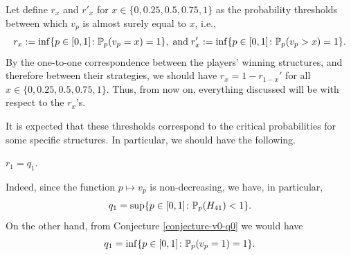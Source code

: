         Let define $r_{x}$ and $r'_{x}$ for $x \in \{0, 0.25, 0.5, 0.75, 1\}$ as the probability thresholds between which $v_p$ is almost surely equal to $x$, i.e.,
        \begin{equation*}
            r_x := \inf\{p \in [0, 1] \colon \mathbb{P}_p(v_p =  x) = 1\}, \; \text{and} \; r_x' := \inf\{p \in [0, 1] \colon \mathbb{P}_p(v_p > x) = 1\}.
        \end{equation*}
       By the one-to-one correspondence between the players' winning structures, and therefore between their strategies, we should have $r_x = 1 - r_{1-x}'$ for all $x \in \{0, 0.25, 0.5, 0.75, 1\}$. Thus, from now on, everything discussed will be with respect to the $r_x$'s.
        
        It is expected that these thresholds correspond to the critical probabilities for some specific structures. In particular, we should have the following.

        \begin{conjecture}\label{conjecture_q1_r1}
            $r_1 = q_1$.
        \end{conjecture}

        Indeed, since the function $p \mapsto v_p$ is non-decreasing, we have, in particular,
        $$
            q_1 = \sup \{p \in [0, 1] \colon \mathbb{P}_p(H_{41}) < 1\}.
        $$ 
        On the other hand, from Conjecture \ref{conjecture-v0-q0} we would have
        $$
            q_1 = \inf \{p \in [0, 1] \colon \mathbb{P}_p(v_p = 1) = 1\}.
        $$
        
